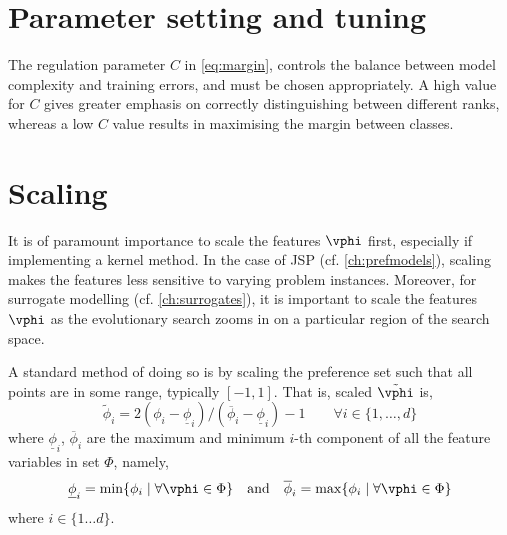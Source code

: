 \begin{comment}
\subsection{Kernel functions}
There are several choices for a kernel $\kappa$, e.g., \emph{polynomial kernel},
\begin{eqnarray}
	\kappa_{\text{poly}}(\vec{x}_i,\vec{x}_j)&=& \left(1+\inner{\vec{x}_i}{\vec{x}_j} \right)^p
\end{eqnarray}
of order $p$, or the most commonly used kernel in the literature which implements a Gauss\-ian radial basis function, the \emph{rbf kernel},
\begin{eqnarray}
	\kappa_{\text{rbf}}(\vec{x}_i,\vec{x}_j)&=& e^{-\gamma \norm{\vec{x}_i-\vec{x}_j}^2}
\end{eqnarray}
for $\gamma>0$.
\end{comment}

\section{Parameter setting and tuning}
The regulation parameter $C$ in \cref{eq:margin}, controls the balance between model complexity and training errors, and must be chosen appropriately. A high value for $C$ gives greater emphasis on correctly distinguishing between different ranks, whereas a low $C$ value results in maximising the margin between classes.

\section{Scaling}
It is of paramount importance to scale the features $\vphi$ first, especially if implementing a kernel method. 
In the case of JSP (cf. \cref{ch:prefmodels}), scaling makes the features less sensitive to varying problem instances.
Moreover, for surrogate modelling (cf. \cref{ch:surrogates}), it is important to scale the features $\vphi$ as the evolutionary search zooms in on a particular region of the search space. 

A standard method of doing so is by scaling the preference set such that all points are in some range, typically $[-1,1]$. That is, scaled $\tilde{\vphi}$ is,
\begin{equation}\label{eq:scale}
	\tilde{\phi}_i = 2 (\phi_i - \underline{\phi}_i) / (\overline{\phi}_i - \underline{\phi}_i) - 1 
	\quad\quad \forall i\in\{1,\ldots,d\}
\end{equation}
where $\underline{\phi}_i$, $\overline{\phi}_i$ are the maximum and minimum $i$-th component of all the feature variables in set $\Phi$, namely,
\begin{equation}
	\underline{\phi}_i=\min\{\phi_i\;|\;\forall\vphi\in \Phi\} \quad\textrm{and}\quad \overline{\phi}_i=\max\{\phi_i\;|\;\forall\vphi\in \Phi\}
\end{equation}
where $i\in\{1\ldots d\}$. 


